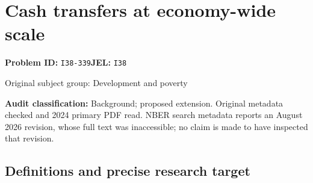 \documentclass[11pt,a4paper]{article}
\begin{document}
\section*{Cash transfers at economy-wide scale}
\textbf{Problem ID:} \texttt{I38-339}\quad \textbf{JEL:} \texttt{I38}\par
\label{problem:OP-0372}
{\sffamily\small\color{muted}Original subject group: Development and poverty\par}
\label{definitions:problem:30007654}
\textbf{Audit classification:} Background; proposed extension. Original metadata checked and 2024 primary PDF read. NBER search metadata reports an August 2026 revision, whose full text was inaccessible; no claim is made to have inspected that revision.
\subsection*{Definitions and precise research target}
\end{document}
